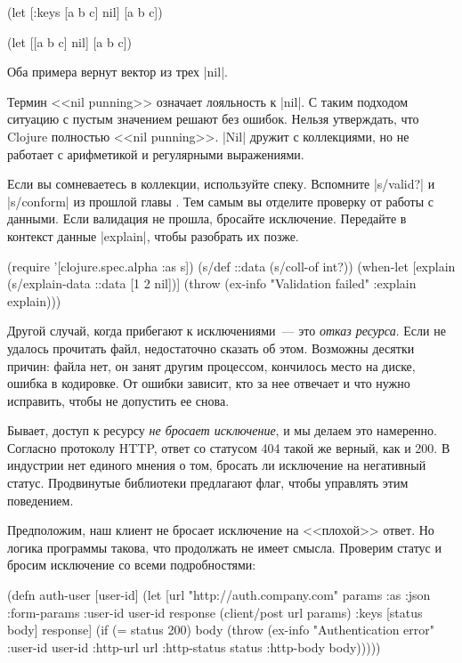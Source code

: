 \begin{english}
  \begin{clojure}
(let [{:keys [a b c]} nil]
  [a b c])

(let [[a b c] nil]
  [a b c])
  \end{clojure}
\end{english}

\noindent
Оба примера вернут вектор из трех \spverb|nil|.

Термин <<nil punning>> означает лояльность к \spverb|nil|. С таким подходом
ситуацию с пустым значением решают без ошибок. Нельзя утверждать, что Clojure
полностью <<nil punning>>. \spverb|Nil| дружит с коллекциями, но не работает с
арифметикой и регулярными выражениями.

Если вы сомневаетесь в коллекции, используйте спеку. Вспомните \spverb|s/valid?|
и \spverb|s/conform| из прошлой главы . Тем самым вы отделите
проверку от работы с данными. Если валидация не прошла, бросайте
исключение. Передайте в контекст данные \spverb|explain|, чтобы разобрать их
позже.

\begin{english}
  \begin{clojure}
(require '[clojure.spec.alpha :as s])
(s/def ::data (s/coll-of int?))
(when-let [explain (s/explain-data ::data [1 2 nil])]
  (throw (ex-info "Validation failed" {:explain explain})))
  \end{clojure}
\end{english}

Другой случай, когда прибегают к исключениями~--- это \emph{отказ ресурса}. Если
не удалось прочитать файл, недостаточно сказать об этом. Возможны десятки
причин: файла нет, он занят другим процессом, кончилось место на диске, ошибка в
кодировке. От ошибки зависит, кто за нее отвечает и что нужно исправить, чтобы
не допустить ее снова.

Бывает, доступ к ресурсу \emph{не бросает исключение}, и мы делаем это
намеренно. Согласно протоколу HTTP, ответ со статусом 404 такой же верный, как и
200. В индустрии нет единого мнения о том, бросать ли исключение на негативный
статус. Продвинутые библиотеки предлагают флаг, чтобы управлять этим поведением.

Предположим, наш клиент не бросает исключение на <<плохой>> ответ. Но логика
программы такова, что продолжать не имеет смысла. Проверим статус и бросим
исключение со всеми подробностями:

\begin{english}
  \begin{clojure}
(defn auth-user [user-id]
  (let [url "http://auth.company.com"
        params {:as :json :form-params {:user-id user-id}}
        response (client/post url params)
        {:keys [status body]} response]
    (if (= status 200)
      body
      (throw (ex-info "Authentication error"
                      {:user-id user-id
                       :http-url url
                       :http-status status
                       :http-body body})))))
  \end{clojure}
\end{english}

